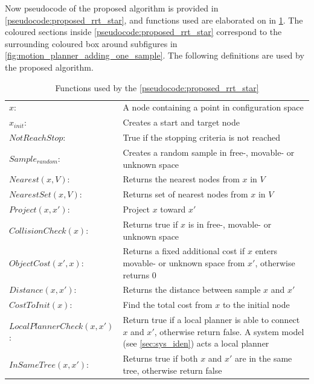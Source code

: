 Now pseudocode of the proposed algorithm is provided in \cref{pseudocode:proposed_rrt_star}, and functions used are elaborated on in \cref{table:functions_for_proposed_rrt_star}. The coloured sections inside \cref{pseudocode:proposed_rrt_star} correspond to the surrounding coloured box around subfigures in \cref{fig:motion_planner_adding_one_sample}. The following definitions are used by the proposed algorithm.\bs



\begin{table}[H]
\centering
\begin{tabular}[t]{l p{10cm}}
$x$:& A node containing a point in configuration space\\
$x_{init}$:& Creates a start and target node\\ 
$NotReachStop$:& True if the stopping criteria is not reached\\ 
$Sample_{random}$:& Creates a random sample in free-, movable- or unknown space\\
$Nearest(x, V)$:& Returns the nearest nodes from $x$ in $V$\\
$NearestSet(x, V)$:& Returns set of nearest nodes from $x$ in $V$\\
$Project(x, x')$:& Project $x$ toward $x'$\\
$CollisionCheck(x)$:& Returns true if $x$ is in free-, movable- or unknown space\\
$ObjectCost(x', x)$:& Returns a fixed additional cost if $x$ enters movable- or unknown space from $x'$, otherwise returns 0\\
$Distance(x, x')$:& Returns the distance between sample $x$ and $x'$\\
$CostToInit(x)$:& Find the total cost from $x$ to the initial node\\
$LocalPlannerCheck(x, x')$:& Return true if a local planner is able to connect $x$ and $x'$, otherwise return false. A system model (see \cref{sec:sys_iden}) acts a local planner\\
$InSameTree(x, x')$:& Returns true if both $x$ and $x'$ are in the same tree, otherwise return false\\
\end{tabular}
\caption{Functions used by the \cref{pseudocode:proposed_rrt_star}}
\label{table:functions_for_proposed_rrt_star}
\end{table}

